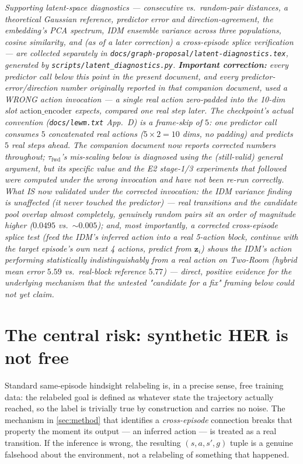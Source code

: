 \documentclass[11pt]{article}
\newcommand{\zv}{\mathbf{z}}
\begin{document}
\textit{Supporting latent-space diagnostics --- consecutive vs.\ random-pair distances, a
theoretical Gaussian reference, predictor error and direction-agreement, the embedding's PCA
spectrum, IDM ensemble variance across three populations, cosine similarity, and (as of a
later correction) a cross-episode splice verification --- are collected separately in
\texttt{docs/graph-proposal/latent-diagnostics.tex}, generated by
\texttt{scripts/latent\_diagnostics.py}. \textbf{Important correction:} every predictor call
below this point in the present document, and every predictor-error/direction number
originally reported in that companion document, used a WRONG action invocation --- a single
real action zero-padded into the 10-dim slot $\mathrm{action\_encoder}$ expects, compared
one real step later. The checkpoint's actual convention (\texttt{docs/lewm.txt} App.\ D) is a
frame-skip of $5$: one predictor call consumes $5$ concatenated real actions
($5\times2{=}10$ dims, no padding) and predicts $5$ real steps ahead. The companion document
now reports corrected numbers throughout; $\tau_{\mathrm{fwd}}$'s mis-scaling below is
diagnosed using the (still-valid) general argument, but its specific value and the E2
stage-1/3 experiments that followed were computed under the wrong invocation and have not
been re-run correctly. What IS now validated under the corrected invocation: the IDM
variance finding is unaffected (it never touched the predictor) --- real transitions and the
candidate pool overlap almost completely, genuinely random pairs sit an order of magnitude
higher ($0.0495$ vs.\ $\sim\!0.005$); and, most importantly, a corrected cross-episode splice
test (feed the IDM's inferred action into a real 5-action block, continue with the target
episode's own next 4 actions, predict from $\zv_i$) shows the IDM's action performing
\emph{statistically indistinguishably} from a real action on Two-Room (hybrid mean error
$5.59$ vs.\ real-block reference $5.77$) --- direct, positive evidence for the underlying
mechanism that the untested "candidate for a fix" framing below could not yet claim.}

\section{The central risk: synthetic HER is not free}
\label{sec:risk}

Standard same-episode hindsight relabeling is, in a precise sense, free training data: the
relabeled goal is defined as whatever state the trajectory actually reached, so the label is
trivially true by construction and carries no noise. The mechanism in \cref{sec:method} that
identifies a \emph{cross-episode} connection breaks that property the moment its output ---
an inferred action --- is treated as a real transition. If the inference is wrong, the
resulting $(s,a,s',g)$ tuple is a genuine falsehood about the environment, not a relabeling of
something that happened.
\end{document}
